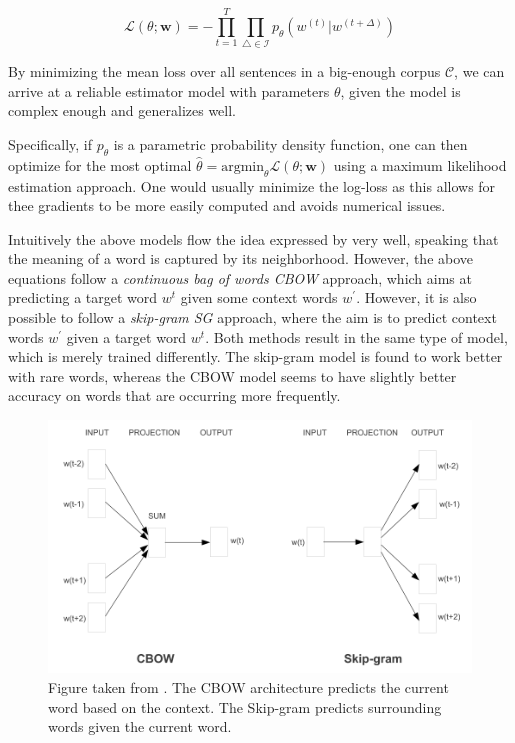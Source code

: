 \documentclass[a4paper,12pt,twoside,openright]{report}
\begin{document}
\begin{equation}
\mathcal{L}(\theta ; \mathbf{w})= - \prod_{t=1}^{T} \prod_{\triangle \in \mathcal{I}} p_{\theta}\left(w^{(t)} | w^{(t +\Delta)}\right)
\end{equation}{\label{eq:basic_equation_log_maximization}}

By minimizing the mean loss over all sentences in a big-enough corpus $\mathcal{C}$, we can arrive at a reliable estimator model with parameters $\theta$, given the model is complex enough and generalizes well.

Specifically, if $p_\theta$ is a parametric probability density function, one can then optimize for the most optimal $\hat{\theta} = \text{argmin}_\theta \mathcal{L}(\theta ; \mathbf{w})$ using a maximum likelihood estimation approach.
One would usually minimize the log-loss as this allows for thee gradients to be more easily computed and avoids numerical issues.

Intuitively the above models flow the idea expressed by \cite{harris54} very well, speaking that the meaning of a word is captured by its neighborhood.
However, the above equations follow a \textit{continuous bag of words CBOW} approach, which aims at predicting a target word $w^t$ given some context words $w^{\prime}$.
However, it is also possible to follow a \textit{skip-gram SG} approach, where the aim is to predict context words $w^{\prime}$ given a target word $w^t$.
Both methods result in the same type of model, which is merely trained differently.
The skip-gram model is found to work better with rare words, whereas the CBOW model seems to have slightly better accuracy on words that are occurring more frequently.


\begin{figure}[h]
	\center
  \includegraphics[width=0.6\linewidth]{./assets/background/cbow_and_skipgram.png}
  \caption{Figure taken from \cite{mikolov13}. The CBOW architecture predicts the current word based on the context. The Skip-gram predicts surrounding words given the current word.}
  \label{fig:cbow_skipgram}
\end{figure}
\end{document}
